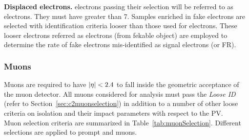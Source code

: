 \textbf {Displaced electrons.}
\Displ electrons passing their selection will be referred to as
\tD electrons.
They must have \pt greater than 7\GeV.
Samples enriched in fake electrons are selected with
identification criteria looser than those used for \tD
electrons. These looser electrons referred as \fo electrons (from
fekable object) are employed to determine the rate of fake electrons
mis-identified as signal electrons (\fr or FR).
\begin{table}[h!]
  \centering
  \caption{\label{tab:electronSelection} Requirements for an electron
    to pass each of the defined selection working points. Variables
    defined in Section~\ref{sec:c2variables}.}
\end{table}

\subsubsection{Muons}\label{sec:llmuon}
Muons are required to have
$|\eta|<2.4$ to fall inside the geometric acceptance of the muon
detector.
All muons considered for analysis must pass the \emph{Loose ID} (refer
to Section~\ref{sec:c2muonselection}) in addition to a number
of other loose criteria on isolation and their impact parameters with
respect to the PV.\\
Muon selection criteria are summarized in
Table~\ref{tab:muonSelection}. Different selections are applied to prompt and \displ muons.

